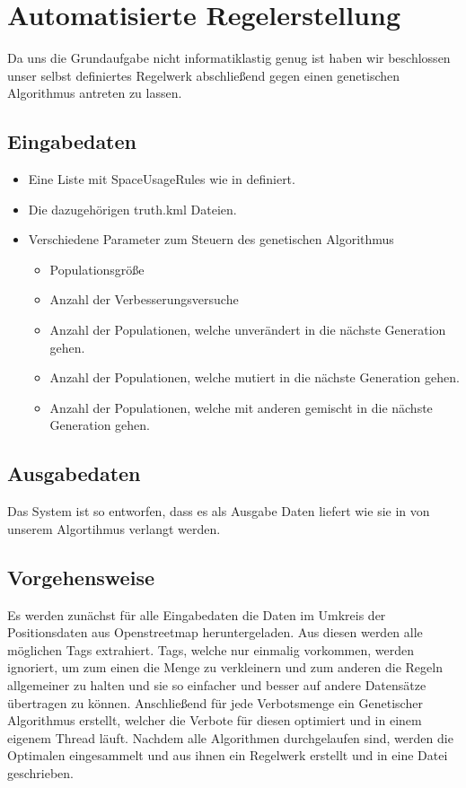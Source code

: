 \section{Automatisierte Regelerstellung}
Da uns die Grundaufgabe nicht informatiklastig genug ist
haben wir beschlossen unser selbst definiertes Regelwerk abschließend gegen
einen genetischen Algorithmus antreten zu lassen.

\subsection{Eingabedaten}
\begin{itemize}
\item Eine Liste mit SpaceUsageRules wie in  definiert.
\item Die dazugehörigen truth.kml Dateien.
\item Verschiedene Parameter zum Steuern des genetischen Algorithmus
  \begin{itemize}
  \item Populationsgröße
  \item Anzahl der Verbesserungsversuche
  \item Anzahl der Populationen, welche unverändert in die nächste Generation gehen.
  \item Anzahl der Populationen, welche mutiert in die nächste Generation gehen.
  \item Anzahl der Populationen, welche mit anderen gemischt in die nächste Generation gehen.
  \end{itemize}
\end{itemize}

\subsection{Ausgabedaten}
Das System ist so entworfen, dass es als Ausgabe Daten liefert wie sie in  von unserem Algortihmus verlangt werden.

\subsection{Vorgehensweise}
Es werden zunächst für alle Eingabedaten die Daten im Umkreis der Positionsdaten aus Openstreetmap heruntergeladen.
Aus diesen werden alle möglichen Tags extrahiert. Tags, welche nur einmalig vorkommen, werden ignoriert, um zum einen die Menge zu verkleinern
und zum anderen die Regeln allgemeiner zu halten und sie so einfacher und besser auf andere Datensätze übertragen zu können.
Anschließend für jede Verbotsmenge ein Genetischer Algorithmus erstellt, welcher die Verbote für diesen optimiert und in einem eigenem Thread läuft.
Nachdem alle Algorithmen durchgelaufen sind, werden die Optimalen eingesammelt und aus ihnen ein Regelwerk erstellt und in eine Datei geschrieben.

